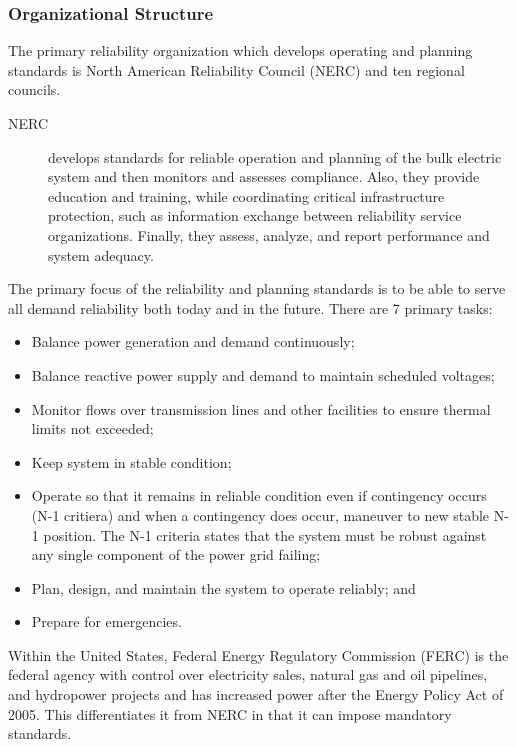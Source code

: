 \subsubsection{Organizational Structure}
The primary reliability organization which develops operating and planning standards is North American Reliability Council (NERC) and ten regional councils. 
\begin{description}
\item[NERC] develops standards for reliable operation and planning of the bulk electric system and then monitors and assesses compliance.  Also, they provide education and training, while coordinating critical infrastructure protection, such as information exchange between reliability service organizations.  Finally, they assess, analyze, and report performance and system adequacy.
\end{description}
 The primary focus of the reliability and planning standards is to be able to serve all demand reliability both today and in the future.  There are 7 primary tasks:
\begin{itemize}
\item Balance power generation and demand continuously;
\item Balance reactive power supply and demand to maintain scheduled voltages;
\item Monitor flows over transmission lines and other facilities to ensure thermal limits not exceeded;
\item Keep system in stable condition;
\item Operate so that it remains in reliable condition even if contingency occurs (N-1 critiera) and when a contingency does occur, maneuver to new stable N-1 position. The N-1 criteria states that the system must be robust against any single component of the power grid failing;
\item Plan, design, and maintain the system to operate reliably; and
\item Prepare for emergencies.
\end{itemize}

Within the United States, Federal Energy Regulatory Commission (FERC) is the federal agency with control over electricity sales, natural gas and oil pipelines, and hydropower projects and has increased power after the  Energy Policy Act of 2005.  This differentiates it from NERC in that it can impose mandatory standards.

